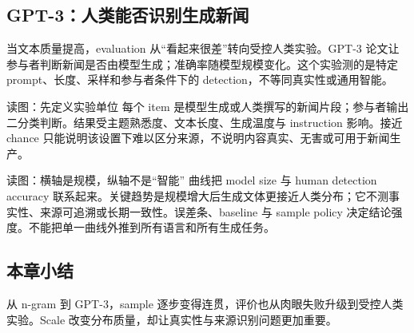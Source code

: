 \subsection{GPT-3：人类能否识别生成新闻}

当文本质量提高，evaluation 从“看起来很差”转向受控人类实验。GPT-3 论文让参与者判断新闻是否由模型生成；准确率随模型规模变化。这个实验测的是特定 prompt、长度、采样和参与者条件下的 detection，不等同真实性或通用智能。


\begin{knowledgebox}{读图：先定义实验单位}
每个 item 是模型生成或人类撰写的新闻片段；参与者输出二分类判断。结果受主题熟悉度、文本长度、生成温度与 instruction 影响。接近 chance 只能说明该设置下难以区分来源，不说明内容真实、无害或可用于新闻生产。
\end{knowledgebox}


\begin{knowledgebox}{读图：横轴是规模，纵轴不是“智能”}
曲线把 model size 与 human detection accuracy 联系起来。关键趋势是规模增大后生成文体更接近人类分布；它不测事实性、来源可追溯或长期一致性。误差条、baseline 与 sample policy 决定结论强度。不能把单一曲线外推到所有语言和所有生成任务。
\end{knowledgebox}

\subsection{本章小结}

从 n-gram 到 GPT-3，sample 逐步变得连贯，评价也从肉眼失败升级到受控人类实验。Scale 改变分布质量，却让真实性与来源识别问题更加重要。

